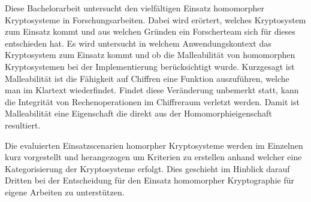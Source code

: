 Diese Bachelorarbeit untersucht den vielfältigen Einsatz homomorpher Kryptosysteme in Forschungsarbeiten. Dabei wird erörtert, welches Kryptosystem zum Einsatz kommt und aus welchen Gründen ein Forscherteam sich für dieses entschieden hat. Es wird untersucht in welchem Anwendungskontext das Kryptosystem zum Einsatz kommt und ob die Malleabilität von homomorphen Kryptosystemen bei der Implementierung berücksichtigt wurde. Kurzgesagt ist Malleabilität ist die Fähigkeit auf Chiffren eine Funktion auszuführen, welche man im Klartext wiederfindet. Findet diese Veränderung unbemerkt statt, kann die Integrität von Rechenoperationen im Chiffreraum verletzt werden. Damit ist Malleabilität eine Eigenschaft die direkt aus der Homomorphieigenschaft resultiert. 

Die evaluierten Einsatzscenarien homorpher Kryptosysteme werden im Einzelnen kurz vorgestellt und herangezogen um Kriterien zu erstellen anhand welcher eine Kategorisierung der Kryptosysteme erfolgt. Dies geschieht im Hinblick darauf Dritten bei der Entscheidung für den Einsatz homomorpher Kryptographie für eigene Arbeiten zu unterstützen.
 